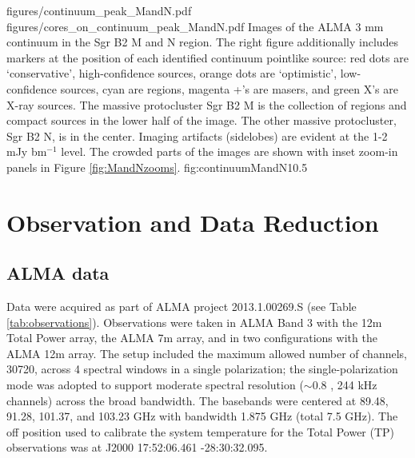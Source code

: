 \documentclass[twocolumn]{aastex61}
\begin{document}
\FigureTwo
{figures/continuum_peak_MandN.pdf}
{figures/cores_on_continuum_peak_MandN.pdf}
{Images of the ALMA 3 mm continuum in the Sgr B2 M and N region.  The right
figure additionally includes markers at the position of each identified
continuum pointlike source: red dots are `conservative', high-confidence
sources, orange dots are `optimistic', low-confidence sources, cyan are \hii
regions, magenta +'s are masers, and green X's are X-ray sources.  The massive
protocluster Sgr B2 M is the collection of \hii regions and compact sources in
the lower half of the image.  The other massive protocluster, Sgr B2 N, is in
the center.  Imaging artifacts (sidelobes) are evident at the 1-2 mJy bm$^{-1}$
level.  The crowded parts of the images are shown with inset zoom-in panels in
Figure \ref{fig:MandNzooms}.
}
{fig:continuumMandN}{1}{0.5\textwidth}

\section{Observation and Data Reduction}
\label{sec:observations}
\subsection{ALMA data}
Data were acquired as part of ALMA project 2013.1.00269.S (see Table
\ref{tab:observations}).  Observations were taken in ALMA Band 3 with the 12m
Total Power array, the ALMA 7m array, and in two
configurations with the ALMA 12m array.  The setup included the maximum allowed
number of channels, 30720, across 4 spectral windows in a single polarization;
the single-polarization mode was adopted to support moderate spectral
resolution ($\sim0.8$ \kms, 244 kHz channels) across the broad bandwidth.  The
basebands were centered at 89.48, 91.28, 101.37, and 103.23 GHz with bandwidth
1.875 GHz (total 7.5 GHz).  The off position used to calibrate the system
temperature for the Total Power (TP) observations was at J2000 17:52:06.461
-28:30:32.095.
\end{document}
